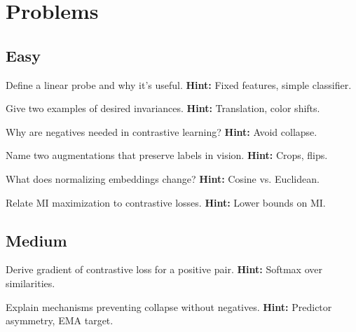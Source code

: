 
\section*{Problems}

\subsection*{Easy}
\begin{problem}
Define a linear probe and why it’s useful.
\textbf{Hint:} Fixed features, simple classifier.
\end{problem}

\begin{problem}[Invariance]
Give two examples of desired invariances.
\textbf{Hint:} Translation, color shifts.
\end{problem}

\begin{problem}
Why are negatives needed in contrastive learning?
\textbf{Hint:} Avoid collapse.
\end{problem}

\begin{problem}[Augmentations]
Name two augmentations that preserve labels in vision.
\textbf{Hint:} Crops, flips.
\end{problem}

\begin{problem}
What does normalizing embeddings change?
\textbf{Hint:} Cosine vs. Euclidean.
\end{problem}

\begin{problem}
Relate MI maximization to contrastive losses.
\textbf{Hint:} Lower bounds on MI.
\end{problem}

\subsection*{Medium}
\begin{problem}[NT-Xent]
Derive gradient of contrastive loss for a positive pair.
\textbf{Hint:} Softmax over similarities.
\end{problem}

\begin{problem}
Explain mechanisms preventing collapse without negatives.
\textbf{Hint:} Predictor asymmetry, EMA target.
\end{problem}

